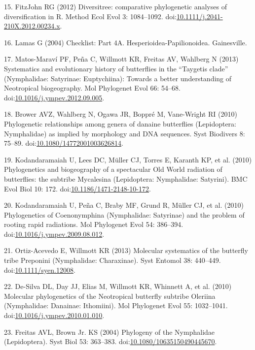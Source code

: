 \documentclass[10pt]{article}
\begin{document}
15. {FitzJohn} RG (2012) Diversitree: comparative phylogenetic analyses
of diversification in R. Method Ecol Evol 3: 1084--1092.
doi:\href{http://dx.doi.org/10.1111/j.2041-210X.2012.00234.x}{10.1111/j.2041-210X.2012.00234.x}.

16. Lamas G (2004) Checklist: Part 4A. Hesperioidea-Papilionoidea.
Gainesville.

17. Matos-Maraví PF, Peña C, Willmott KR, Freitas AV, Wahlberg N (2013)
Systematics and evolutionary history of butterflies in the ``Taygetis
clade'' (Nymphalidae: Satyrinae: Euptychiina): Towards a better
understanding of Neotropical biogeography. Mol Phylogenet Evol 66:
54--68.
doi:\href{http://dx.doi.org/10.1016/j.ympev.2012.09.005}{10.1016/j.ympev.2012.09.005}.

18. Brower AVZ, Wahlberg N, Ogawa JR, Boppré M, Vane-Wright RI (2010)
Phylogenetic relationships among genera of danaine butterflies
(Lepidoptera: Nymphalidae) as implied by morphology and DNA sequences.
Syst Biodivers 8: 75--89.
doi:\href{http://dx.doi.org/10.1080/14772001003626814}{10.1080/14772001003626814}.

19. Kodandaramaiah U, Lees DC, Müller CJ, Torres E, Karanth KP, et al.
(2010) Phylogenetics and biogeography of a spectacular Old World
radiation of butterflies: the subtribe Mycalesina (Lepidoptera:
Nymphalidae: Satyrini). BMC Evol Biol 10: 172.
doi:\href{http://dx.doi.org/10.1186/1471-2148-10-172}{10.1186/1471-2148-10-172}.

20. Kodandaramaiah U, Peña C, Braby MF, Grund R, Müller CJ, et al.
(2010) Phylogenetics of Coenonymphina (Nymphalidae: Satyrinae) and the
problem of rooting rapid radiations. Mol Phylogenet Evol 54: 386--394.
doi:\href{http://dx.doi.org/10.1016/j.ympev.2009.08.012}{10.1016/j.ympev.2009.08.012}.

21. Ortiz-Acevedo E, Willmott KR (2013) Molecular systematics of the
butterfly tribe Preponini (Nymphalidae: Charaxinae). Syst Entomol 38:
440--449.
doi:\href{http://dx.doi.org/10.1111/syen.12008}{10.1111/syen.12008}.

22. De-Silva DL, Day JJ, Elias M, Willmott KR, Whinnett A, et al. (2010)
Molecular phylogenetics of the Neotropical butterfly subtribe Oleriina
(Nymphalidae: Danainae: Ithomiini). Mol Phylogenet Evol 55: 1032--1041.
doi:\href{http://dx.doi.org/10.1016/j.ympev.2010.01.010}{10.1016/j.ympev.2010.01.010}.

23. Freitas AVL, Brown Jr. KS (2004) Phylogeny of the Nymphalidae
(Lepidoptera). Syst Biol 53: 363--383.
doi:\href{http://dx.doi.org/10.1080/10635150490445670}{10.1080/10635150490445670}.
\end{document}
